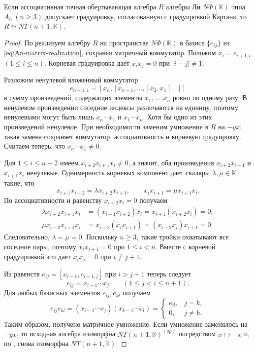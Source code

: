 \documentclass[a4paper,14pt,oneside,openany]{memoir}
\begin{document}
\begin{theorem}\label{th:Stand-Graded-An}
    Если ассоциативная точная обертывающая алгебра $R$ алгебры Ли
    $N\Phi(\mathbb{K})$ типа $A_n\ (n \ge 3)$ допускает градуировку, согласованную
    с градуировкой Картана, то $R \simeq NT(n+1,\mathbb{K})$.
\end{theorem}
\begin{proof}
    По  реализуем алгебру $R$ на пространстве
    $N\Phi(\mathbb{K})$ в базисе $\{e_{ij}\}$ из \eqref{eq:An-matrix-realization},
    сохраняя матричный коммутатор. Положим $x_i=e_{i+1,i}$ $(1\leq i\leq n)$.
    Корневая градуировка дает $x_ix_j=0$ при $|i-j|\neq1$.

    Разложим ненулевой вложенный коммутатор
    \[
        e_{n+1,1}=[x_n,[x_{n-1},\dots,[x_2,x_1]\dots]]
    \]
    в сумму произведений, содержащих элементы $x_1,\dots,x_n$ ровно по одному разу.
    В ненулевом произведении соседние индексы различаются на единицу, поэтому
    ненулевыми могут быть лишь $x_n\cdots x_1$ и $x_1\cdots x_n$. Хотя бы одно из
    этих произведений ненулевое. При необходимости заменим умножение в $R$ на
    $-yx$; такая замена сохраняет коммутатор, ассоциативность и корневую
    градуировку. Считаем теперь, что $x_n\cdots x_1\neq0$.

    Для $1\leq i\leq n-2$ имеем $x_{i+2}x_{i+1}x_i\neq0$, а значит, оба
    произведения $x_{i+2}x_{i+1}$ и $x_{i+1}x_i$ ненулевые. Одномерность корневых
    компонент дает скаляры $\lambda,\mu\in\mathbb{K}$ такие, что
    \[
        x_{i+1}x_{i+2}=\lambda x_{i+2}x_{i+1},\qquad
        x_ix_{i+1}=\mu x_{i+1}x_i.
    \]
    По ассоциативности и равенству $x_{i+2}x_i=0$ получаем
    \[
        \begin{aligned}
            \lambda x_{i+2}x_{i+1}x_i
             & =(x_{i+1}x_{i+2})x_i=x_{i+1}(x_{i+2}x_i)=0, \\
            \mu x_{i+2}x_{i+1}x_i
             & =x_{i+2}(x_ix_{i+1})=(x_{i+2}x_i)x_{i+1}=0.
        \end{aligned}
    \]
    Следовательно, $\lambda=\mu=0$. Поскольку $n\geq3$, такие тройки охватывают все
    соседние пары, поэтому $x_ix_{i+1}=0$ при $1\leq i<n$. Вместе с корневой
    градуировкой это дает $x_ix_j=0$ при $i\neq j+1$.

    Из равенств $e_{ij}=[x_{i-1},e_{i-1,j}]$ при $i>j+1$ теперь следует
    \[
        e_{ij}=x_{i-1}\cdots x_j\qquad(1\leq j<i\leq n+1).
    \]
    Для любых базисных элементов $e_{ij},e_{kl}$ получаем
    \[
        e_{ij}e_{kl}=(x_{i-1}\cdots x_j)(x_{k-1}\cdots x_l)
        =\begin{cases}
            e_{il}, & j=k,     \\
            0,      & j\neq k.
        \end{cases}
    \]
    Таким образом, получено матричное умножение. Если умножение заменялось на
    $-yx$, то исходная алгебра изоморфна $NT(n+1,\mathbb{K})^{(op)}$ посредством
    $x\mapsto-x$ и, по , снова изоморфна
    $NT(n+1,\mathbb{K})$.
\end{proof}
\end{document}

